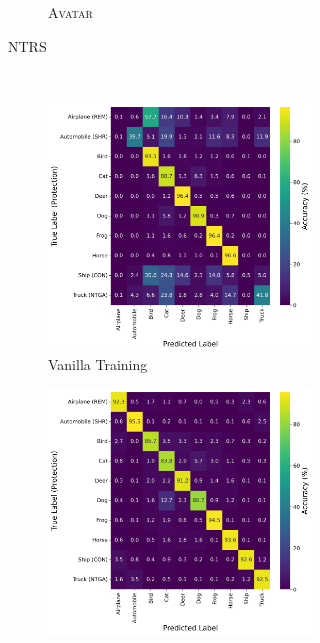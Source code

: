 \documentclass[conference]{IEEEtran}
\theoremstyle{definition}
\theoremstyle{remark}
\theoremstyle{proposition}
\begin{document}
\begin{figure}[p!]
\begin{subfigure}{1.0\textwidth}
\begin{subfigure}{.40\textwidth}
            \caption*{\textsc{Avatar}}
    	\end{subfigure}
	\caption{NTRS}
    \vspace*{2em}
    \end{subfigure}
    \\
    \begin{subfigure}{1.0\textwidth}
    \centering
        \begin{subfigure}{.40\textwidth}
    		\centering
    		\includegraphics[width=1.0\textwidth]{combination_attacks/ResNet18_RSCN_t_0_confusion_matrix.png}
            \caption*{Vanilla Training}
    	\end{subfigure}
     \hspace{5em}
        \begin{subfigure}{.40\textwidth}
    		\centering
    		\includegraphics[width=1.0\textwidth]{combination_attacks/ResNet18_RSCN_t_200_confusion_matrix.png}

\end{subfigure}
\end{subfigure}
\end{figure}
\end{document}
